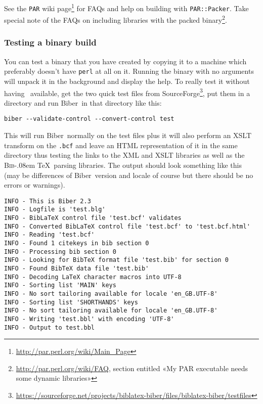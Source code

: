 \documentclass{ltxdockit}
\def\BibTeX{\textsc{Bib}\kern-.08em \TeX}
\newcommand*{\biber}{Biber\xspace}
\begin{document}
See the \verb+PAR+ wiki
page\footnote{\url{http://par.perl.org/wiki/Main_Page}} for FAQs and help
on building with \verb+PAR::Packer+. Take special note of the FAQs on
including libraries with the packed
binary\footnote{\url{http://par.perl.org/wiki/FAQ}, section entitled «My
  PAR executable needs some dynamic libraries»}.

\subsubsection{Testing a binary build}
You can test a binary that you have created by copying it to a machine
which preferably doesn't have \verb+perl+ at all on it. Running the binary with no
arguments will unpack it in the background and display the help. To really
test it without having \latex\ available, get the two quick test files from
SourceForge\footnote{\url{https://sourceforge.net/projects/biblatex-biber/files/biblatex-biber/testfiles}},
put them in a directory and run \biber\ in that directory like this:

\begin{verbatim}
biber --validate-control --convert-control test
\end{verbatim}

\noindent This will run \biber\ normally on the test files plus it
will also perform an XSLT transform on the \verb+.bcf+ and
leave an HTML representation of it in the same directory thus testing the
links to the XML and XSLT libraries as well as the \BibTeX\ parsing
libraries. The output should look something like this (may be differences
of \biber\ version and locale of course but there should be no errors
or warnings).

\begin{verbatim}
INFO - This is Biber 2.3
INFO - Logfile is 'test.blg'
INFO - BibLaTeX control file 'test.bcf' validates
INFO - Converted BibLaTeX control file 'test.bcf' to 'test.bcf.html'
INFO - Reading 'test.bcf'
INFO - Found 1 citekeys in bib section 0
INFO - Processing bib section 0
INFO - Looking for BibTeX format file 'test.bib' for section 0
INFO - Found BibTeX data file 'test.bib'
INFO - Decoding LaTeX character macros into UTF-8
INFO - Sorting list 'MAIN' keys
INFO - No sort tailoring available for locale 'en_GB.UTF-8'
INFO - Sorting list 'SHORTHANDS' keys
INFO - No sort tailoring available for locale 'en_GB.UTF-8'
INFO - Writing 'test.bbl' with encoding 'UTF-8'
INFO - Output to test.bbl
\end{verbatim}
\end{document}
